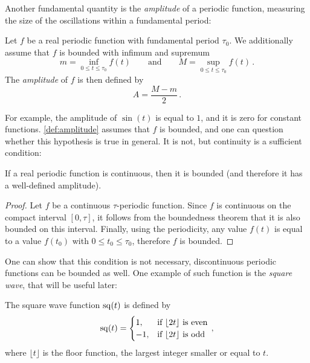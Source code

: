 Another fundamental quantity is the \emph{amplitude} of a periodic function, measuring the
size of the oscillations within a fundamental period:
\begin{definition}
  \label{def:amplitude}
  Let $f$ be a real periodic function with fundamental period $\tau_0$. We additionally
  assume that $f$ is bounded with infimum and supremum
  \begin{equation}
    m=\inf_{0\leq t\leq \tau_0}f(t)\qquad\text{and}\qquad M=\sup_{0\leq t\leq \tau_0}f(t)\,.
  \end{equation}
  The \emph{amplitude} of $f$ is then defined by
  \begin{equation}
    A=\frac{M-m}{2}\,.
  \end{equation}
\end{definition}
For example, the amplitude of $\sin(t)$ is equal to $1$, and it is zero for constant
functions. \cref{def:amplitude} assumes that $f$ is bounded, and one can question whether
this hypothesis is true in general. It is not, but continuity is a sufficient condition:
\begin{proposition}
  If a real periodic function is continuous, then it is bounded (and therefore it has a
  well-defined amplitude).
\end{proposition}
\begin{proof}
  Let $f$ be a continuous $\tau$-periodic function. Since $f$ is continuous on the compact
  interval $[0,\tau]$, it follows from the boundedness theorem that it is also bounded on
  this interval. Finally, using the periodicity, any value $f(t)$ is equal to a value
  $f(t_0)$ with $0\leq t_0\leq \tau_0$, therefore $f$ is bounded.
\end{proof}
One can show that this condition is not necessary, \ie discontinuous periodic functions
can be bounded as well. One example of such function is the \emph{square wave}, that will
be useful later:
\begin{definition}
  \label{def:sq-wave}
  The square wave function $\operatorname{sq}(t)$ is defined by
  \begin{equation}
    \operatorname{sq}(t)=
    \begin{cases}
      1, &\text{if~}\lfloor 2t\rfloor~\text{is even}\\
      -1, &\text{if~}\lfloor 2t\rfloor~\text{is odd}\\
    \end{cases}\,,
    \label{eq:wave-square}
  \end{equation}
  where $\lfloor t\rfloor$ is the floor function, \ie the largest integer smaller or equal
  to $t$.
\end{definition}
